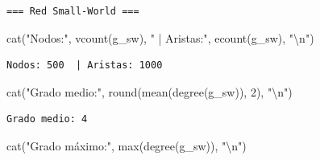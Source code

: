 \documentclass[
  letterpaper,
  DIV=11,
  numbers=noendperiod]{scrreprt}
\newenvironment{Shaded}{\begin{snugshade}}{\end{snugshade}}
\newcommand{\AttributeTok}[1]{\textcolor[rgb]{0.40,0.45,0.13}{#1}}
\newcommand{\DecValTok}[1]{\textcolor[rgb]{0.68,0.00,0.00}{#1}}
\newcommand{\FloatTok}[1]{\textcolor[rgb]{0.68,0.00,0.00}{#1}}
\newcommand{\FunctionTok}[1]{\textcolor[rgb]{0.28,0.35,0.67}{#1}}
\newcommand{\NormalTok}[1]{\textcolor[rgb]{0.00,0.23,0.31}{#1}}
\newcommand{\OtherTok}[1]{\textcolor[rgb]{0.00,0.23,0.31}{#1}}
\newcommand{\SpecialCharTok}[1]{\textcolor[rgb]{0.37,0.37,0.37}{#1}}
\newcommand{\StringTok}[1]{\textcolor[rgb]{0.13,0.47,0.30}{#1}}
\begin{document}
\begin{Shaded}
\end{Shaded}

\begin{verbatim}
=== Red Small-World ===
\end{verbatim}

\begin{Shaded}
\begin{Highlighting}[]
\FunctionTok{cat}\NormalTok{(}\StringTok{"Nodos:"}\NormalTok{, }\FunctionTok{vcount}\NormalTok{(g\_sw), }\StringTok{" | Aristas:"}\NormalTok{, }\FunctionTok{ecount}\NormalTok{(g\_sw), }\StringTok{"}\SpecialCharTok{\textbackslash{}n}\StringTok{"}\NormalTok{)}
\end{Highlighting}
\end{Shaded}

\begin{verbatim}
Nodos: 500  | Aristas: 1000 
\end{verbatim}

\begin{Shaded}
\begin{Highlighting}[]
\FunctionTok{cat}\NormalTok{(}\StringTok{"Grado medio:"}\NormalTok{, }\FunctionTok{round}\NormalTok{(}\FunctionTok{mean}\NormalTok{(}\FunctionTok{degree}\NormalTok{(g\_sw)), }\DecValTok{2}\NormalTok{), }\StringTok{"}\SpecialCharTok{\textbackslash{}n}\StringTok{"}\NormalTok{)}
\end{Highlighting}
\end{Shaded}

\begin{verbatim}
Grado medio: 4 
\end{verbatim}

\begin{Shaded}
\begin{Highlighting}[]
\FunctionTok{cat}\NormalTok{(}\StringTok{"Grado máximo:"}\NormalTok{, }\FunctionTok{max}\NormalTok{(}\FunctionTok{degree}\NormalTok{(g\_sw)), }\StringTok{"}\SpecialCharTok{\textbackslash{}n}\StringTok{"}\NormalTok{)}
\end{Highlighting}
\end{Shaded}
\end{document}

